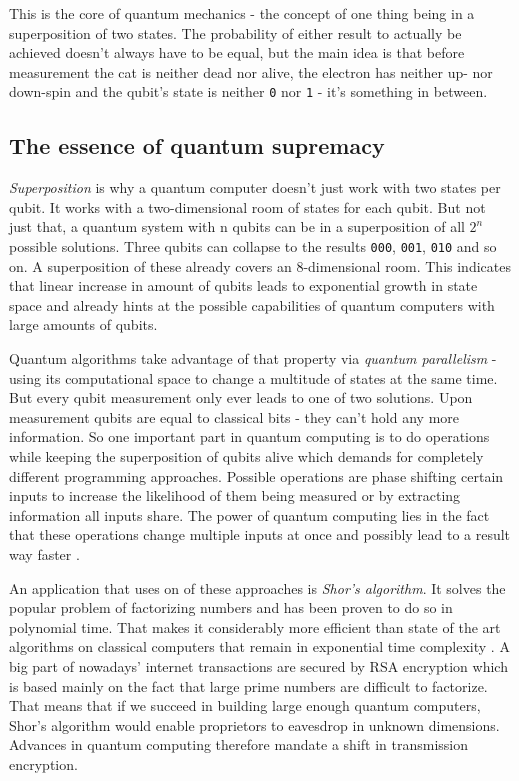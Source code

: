 This is the core of quantum mechanics - the concept of one thing being in a superposition of two states. The probability of either result to actually be achieved doesn't always have to be equal, but the main idea is that before measurement the cat is neither dead nor alive, the electron has neither up- nor down-spin and the qubit's state is neither \texttt{0} nor \texttt{1} - it's something in between.

\subsection{The essence of quantum supremacy}

\textit{Superposition} is why a quantum computer doesn't just work with two states per qubit. It works with a two-dimensional room of states for each qubit. But not just that, a quantum system with n qubits can be in a superposition of all $2^n$ possible solutions. Three qubits can collapse to the results \texttt{000}, \texttt{001}, \texttt{010} and so on. A superposition of these already covers an 8-dimensional room. This indicates that linear increase in amount of qubits leads to exponential growth in state space and already hints at the possible capabilities of quantum computers with large amounts of qubits. \cite[see][p. 308]{Rie98}

Quantum algorithms take advantage of that property via \textit{quantum parallelism} -  using its computational space to change a multitude of states at the same time. But every qubit measurement only ever leads to one of two solutions. Upon measurement qubits are equal to classical bits - they can't hold any more information. So one important part in quantum computing is to do operations while keeping the superposition of qubits alive which demands for completely different programming approaches. Possible operations are phase shifting certain inputs to increase the likelihood of them being measured or by extracting information all inputs share. The power of quantum computing lies in the fact that these operations change multiple inputs at once and possibly lead to a result way faster \cite[see][p. 317]{Rie98}.

An application that uses on of these approaches is \textit{Shor's algorithm}. It solves the popular problem of factorizing numbers and has been proven to do so in polynomial time. That makes it considerably more efficient than state of the art algorithms on classical computers that remain in exponential time complexity \cite[see][p. 251]{Kas06}. A big part of nowadays' internet transactions are secured by RSA encryption which is based mainly on the fact that large prime numbers are difficult to factorize. That means that if we succeed in building large enough quantum computers, Shor's algorithm would enable proprietors to eavesdrop in unknown dimensions. Advances in quantum computing therefore mandate a shift in transmission encryption. 

